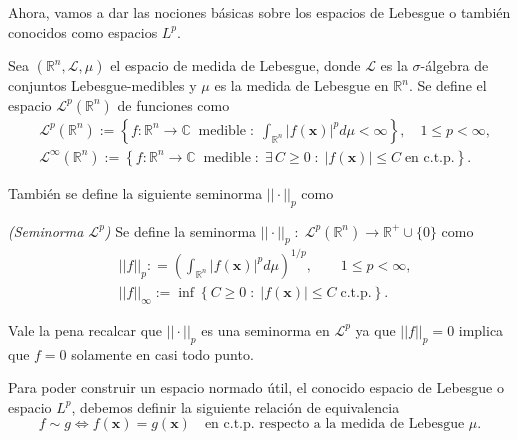         Ahora, vamos a dar las nociones básicas sobre los espacios de Lebesgue \citep{folland1999real} o también conocidos como espacios $L^p$.

        \begin{definition*}
            Sea $\left(\mathbb{R}^n, \mathcal{L}, \mu \right)$ el espacio de medida de Lebesgue, donde $\mathcal{L}$ es la $\sigma$-álgebra de conjuntos Lebesgue-medibles y $\mu$ es la medida de Lebesgue en $\mathbb{R}^n$. Se define el espacio $\mathcal{L}^p(\mathbb{R}^n)$ de funciones como
            \begin{align}
                & \mathcal{L}^p\left(\mathbb{R}^n\right) := \left\{f: \mathbb{R}^n \rightarrow \mathbb{C}\;\; \text{medible} \; : \; \int_{\mathbb{R}^n} \left|f(\mathbf{x}) \right|^p d\mu < \infty \right\}, \quad 1 \leq p < \infty,\\
                & \mathcal{L}^\infty \left(\mathbb{R}^n\right) := \left\{f: \mathbb{R}^n \rightarrow \mathbb{C}\;\; \text{medible} \; : \; \exists\, C \geq 0 \;:\; \left|f(\mathbf{x})\right|\leq C \; \text{en c.t.p.}\right\}.
            \end{align}

        \end{definition*}

        También se define la siguiente seminorma \citep{stein2005real} $||\cdot||_p$ como

        \begin{definition*}
            \textit{(Seminorma $\mathcal{L}^p$)} Se define la seminorma $||\cdot||_p\; :\; \mathcal{L}^p\left(\mathbb{R}^n\right)  \longrightarrow \mathbb{R}^+\cup \{0\}$ como
            \begin{align*}
                & ||f||_p : = \left( \int_{\mathbb{R}^n} \left| f(\mathbf{x}) \right|^p d\mu \right)^{1/p}, \qquad 1 \leq p < \infty,\\
                & ||f||_\infty := \inf \left\{ C \geq 0 \;:\; \left|f(\mathbf{x})\right|\leq C \; \text{c.t.p.} \right\}.
            \end{align*}
        \end{definition*}

        Vale la pena recalcar que $||\cdot||_p$ es una seminorma en $\mathcal{L}^p$ ya que $||f||_p=0$ implica que $f=0$ solamente en casi todo punto. 

        Para poder construir un espacio normado útil, el conocido espacio de Lebesgue o espacio $L^p$, debemos definir la siguiente relación de equivalencia
        \begin{equation*}
            f \sim g \iff f(\mathbf{x}) = g(\mathbf{x}) \quad \text{en c.t.p. respecto a la medida de Lebesgue $\mu$}.
        \end{equation*}

